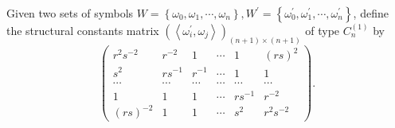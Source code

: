 \documentclass[10pt,a4paper]{amsart}
\numberwithin{equation}{section}
\begin{document}
	Given two sets of symbols $W=\left\{\omega_0, \omega_1, \cdots, \omega_n\right\}, W^{\prime}=\left\{\omega_0^{\prime}, \omega_1^{\prime}, \cdots, \omega_n^{\prime}\right\}$, define the structural constants matrix $\left(\left\langle\omega_i^{\prime}, \omega_j\right\rangle\right)_{(n+1) \times (n+1)}$ of type $C_n^{(1)}$ by
	$$
	\left(\begin{array}{cccccc}
		r^{2} s^{-2} & r^{-2} & 1 & \cdots & 1 & (rs)^{2} \\
		s^{2} & r s^{-1} & r^{-1} & \cdots & 1 & 1 \\
		\cdots & \cdots & \cdots & \cdots & \cdots & \cdots \\
		1 & 1 & 1 & \cdots & r s^{-1} & r^{-2} \\
		(r s)^{-2} & 1 & 1 & \cdots & s^{2} & r^{2} s^{-2}
	\end{array}\right).
	$$
\end{document}
